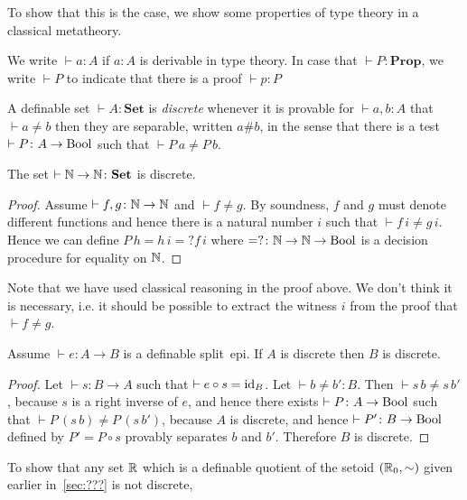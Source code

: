 \documentclass{llncs}
\newcommand{\prop}{\mathbf{Prop}}
\newcommand{\Set}{\mathbf{Set}}
\newcommand{\eqqm}{{=?}}
\begin{document}
To show that this is the case, we show some properties of type theory in a classical metatheory.

We write $\vdash a\colon A$ if $a\colon A$ is derivable in type theory. In case that $\vdash P\colon \prop$, we write $\vdash P$ to indicate that there is a proof $\vdash p\colon P$
\begin{definition}
A definable set $\vdash A\colon \Set$ is \emph{discrete} whenever it is provable for $\vdash a, b\colon A$ that  $\vdash a\not= b$
then they are separable, written $a\#b$, in the sense that there is a test $\vdash P \colon A \to \mathrm{Bool}$  such that $\vdash P\,a \neq P\,b$.
\end{definition}
\begin{proposition}
The set $\vdash \nat\to\nat\colon\Set$ is discrete. 
\end{proposition}
\begin{proof}
Assume $\vdash f, g\colon \mathbb {N} \to \mathbb {N}$ and $\vdash f\neq g$. By soundness, $f$ and $g$ must denote different functions and hence there is a natural number $i$ such that $\vdash f\,i\neq g\,i$. Hence we can define $P\,h = h\,i{\eqqm}f\,i$ where ${\eqqm}\colon \nat\to\nat\to\bool$ is a decision procedure for equality on $\mathbb {N}$. 
\end{proof}

Note that we have used classical reasoning in the proof above. We don't think it is necessary, i.e. it should be possible to extract the witness $i$ from the proof that $\vdash f\neq g$.

\begin{proposition}
Assume $\vdash e\colon A\to B$ is a definable split~epi.  If $A$ is discrete then $B$ is discrete.
\end{proposition}
\begin{proof}
Let $\vdash s\colon B\to A$ such that $\vdash e\circ s=\operatorname{id}_B$. Let $\vdash b\neq b'\colon B$. Then $\vdash s\,b\neq s\,b'$, because $s$ is a right inverse of $e$, and hence there exists $\vdash P\colon A\to\mathrm{Bool}$ such that $\vdash P\,(s\,b)\neq P\,(s\,b')$, because $A$ is discrete, and hence $\vdash P'\colon B\to\mathrm{Bool}$ defined by $P' = P\circ s$ provably separates $b$ and $b'$.
Therefore $B$ is discrete.
\end{proof}
To show that any set $\mathbb{R}$ which is a definable quotient of the setoid $(\mathbb{R}_0,\sim)$ given earlier in~\ref{sec:???} is not discrete, 
\end{document}
